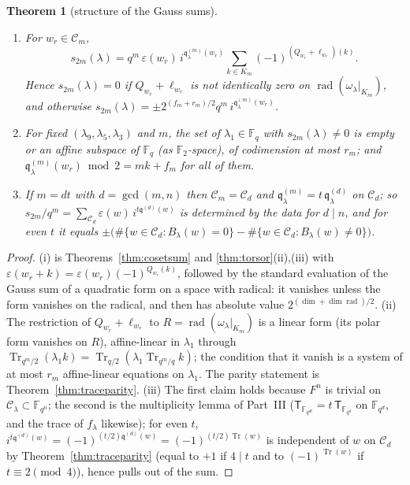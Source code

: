 \documentclass[12pt,a4paper]{amsart}
\newtheorem{theorem}{Theorem}[section]
\theoremstyle{definition}
\newcommand{\F}{\mathbb{F}}
\newcommand{\Tr}{\operatorname{Tr}}
\newcommand{\rad}{\operatorname{rad}}
\newcommand{\eps}{\varepsilon}
\newcommand{\Cc}{\mathcal{C}}
\newcommand{\qq}{\mathfrak{q}}
\newcommand{\Tw}{\mathsf{T}}
\newcommand{\Fq}{\F_{q}}
\begin{document}
\begin{theorem}[structure of the Gauss sums]\label{thm:structure}
\begin{enumerate}[label=\textup{(\roman*)},leftmargin=2em]
\item For $w_r\in\Cc_m$,
\[
s_{2m}(\lambda)=q^m\,\eps(w_r)\,i^{\qq^{(m)}_\lambda(w_r)}\sum_{k\in K_m}(-1)^{(Q_{w_r}+\ell_{w_r})(k)} .
\]
Hence $s_{2m}(\lambda)=0$ if $Q_{w_r}+\ell_{w_r}$ is not identically zero on $\rad(\omega_\lambda|_{K_m})$, and otherwise $s_{2m}(\lambda)=\pm2^{(f_m+r_m)/2}q^m\,i^{\qq^{(m)}_\lambda(w_r)}$.
\item For fixed $(\lambda_9,\lambda_5,\lambda_3)$ and $m$, the set of $\lambda_1\in\Fq$ with $s_{2m}(\lambda)\ne0$ is empty or an affine subspace of $\Fq$ \textup{(}as $\F_2$-space\textup{)}, of codimension at most $r_m$; and $\qq^{(m)}_\lambda(w_r)\bmod 2=mk+f_m$ for all of them.
\item If $m=dt$ with $d=\gcd(m,n)$ then $\Cc_m=\Cc_d$ and $\qq^{(m)}_\lambda=t\,\qq^{(d)}_\lambda$ on $\Cc_d$; so $s_{2m}/q^m=\sum_{\Cc_d}\eps(w)\,i^{t\qq^{(d)}(w)}$ is determined by the data for $d\mid n$, and for even $t$ it equals $\pm\bigl(\#\{w\in\Cc_d:B_\lambda(w)=0\}-\#\{w\in\Cc_d:B_\lambda(w)\ne0\}\bigr)$.
\end{enumerate}
\end{theorem}
\begin{proof}
(i) is Theorems~\ref{thm:cosetsum} and \ref{thm:torsor}(ii),(iii) with $\eps(w_r+k)=\eps(w_r)(-1)^{Q_{w_r}(k)}$, followed by the standard evaluation of the Gauss sum of a quadratic form on a space with radical: it vanishes unless the form vanishes on the radical, and then has absolute value $2^{(\dim+\dim\rad)/2}$. (ii) The restriction of $Q_{w_r}+\ell_{w_r}$ to $R=\rad(\omega_\lambda|_{K_m})$ is a linear form (its polar form vanishes on $R$), affine-linear in $\lambda_1$ through $\Tr_{q^m/2}(\lambda_1k)=\Tr_{q/2}(\lambda_1\Tr_{q^m/q}k)$; the condition that it vanish is a system of at most $r_m$ affine-linear equations on $\lambda_1$. The parity statement is Theorem~\ref{thm:traceparity}. (iii) The first claim holds because $F^n$ is trivial on $\Cc_\lambda\subset\F_{q^n}$; the second is the multiplicity lemma of Part~III ($\Tw_{\F_{q^{dt}}}=t\,\Tw_{\F_{q^d}}$ on $\F_{q^d}$, and the trace of $f_\lambda$ likewise); for even $t$, $i^{t\qq^{(d)}(w)}=(-1)^{(t/2)\qq^{(d)}(w)}=(-1)^{(t/2)\Tr(w)}$ is independent of $w$ on $\Cc_d$ by Theorem~\ref{thm:traceparity} (equal to $+1$ if $4\mid t$ and to $(-1)^{\Tr(w)}$ if $t\equiv2\pmod4$), hence pulls out of the sum.
\end{proof}
\end{document}
